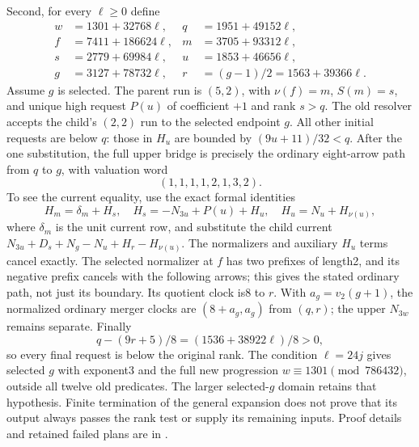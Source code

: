 \documentclass[11pt]{article}
\begin{document}
Second, for every $\ell\ge0$ define
\[
\begin{aligned}
w&=1301+32768\ell,&q&=1951+49152\ell,\\
f&=7411+186624\ell,&m&=3705+93312\ell,\\
s&=2779+69984\ell,&u&=1853+46656\ell,\\
g&=3127+78732\ell,&r&=(g-1)/2=1563+39366\ell.
\end{aligned}
\]
Assume $g$ is selected. The parent run is $(5,2)$, with
$\nu(f)=m$, $S(m)=s$, and unique high request $P(u)$ of coefficient
$+1$ and rank $s>q$. The old resolver accepts the child's $(2,2)$
run to the selected endpoint $g$. All other initial requests are
below $q$: those in $H_u$ are bounded by $(9u+11)/32<q$.
After the one substitution, the full upper bridge is precisely the
ordinary eight-arrow path from $q$ to $g$, with valuation word
\[
 (1,1,1,1,2,1,3,2).
\]
To see the current equality, use the exact formal identities
\[
 H_m=\delta_m+H_s,\quad H_s=-N_{3u}+P(u)+H_u,
 \quad H_u=N_u+H_{\nu(u)},
\]
where $\delta_m$ is the unit current row, and substitute the child
current $N_{3u}+D_s+N_g-N_u+H_r-H_{\nu(u)}$.
The normalizers and auxiliary $H_u$ terms cancel exactly. The selected
normalizer at $f$ has two prefixes of length2, and its negative prefix
cancels with the following arrows; this gives the stated ordinary
path, not just its boundary. Its quotient clock is8 to $r$.
With $a_g=v_2(g+1)$, the normalized ordinary merger clocks are
$(8+a_g,a_g)$ from $(q,r)$; the upper $N_{3w}$ remains separate.
Finally
\[
 q-(9r+5)/8=(1536+38922\ell)/8>0,
\]
so every final request is below the original rank. The condition
$\ell=24j$ gives selected $g$ with exponent3 and the full new
progression $w\equiv1301\pmod{786432}$, outside all twelve old
predicates. The larger selected-$g$ domain retains that hypothesis.
Finite termination of the general expansion does not prove that its
output always passes the rank test or supply its remaining inputs.
Proof details and retained failed plans are in
.
\end{document}
